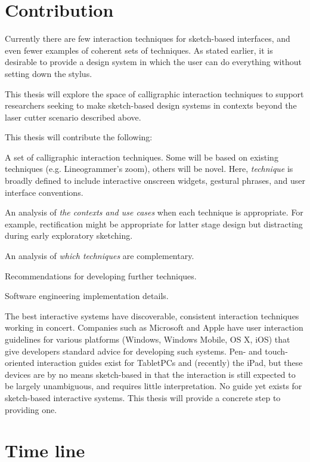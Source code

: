 \documentclass[11pt]{article}
\newenvironment{packed_enum}{
\begin{enumerate}
  \setlength{\itemsep}{1pt}
  \setlength{\parskip}{0pt}
  \setlength{\parsep}{0pt}
}{\end{enumerate}}
\begin{document}
\section{Contribution}

Currently there are few interaction techniques for sketch-based
interfaces, and even fewer examples of coherent sets of techniques. As
stated earlier, it is desirable to provide a design system in which
the user can do everything without setting down the stylus.

This thesis will explore the space of calligraphic interaction
techniques to support researchers seeking to make sketch-based design
systems in contexts beyond the laser cutter scenario described above.

This thesis will contribute the following:
\begin{packed_enum}
\item A set of calligraphic interaction techniques. Some will be based
  on existing techniques (e.g. Lineogrammer's zoom), others will be
  novel. Here, \textit{technique} is broadly defined to include
  interactive onscreen widgets, gestural phrases, and user interface
  conventions.
\item An analysis of \textit{the contexts and use cases} when each
  technique is appropriate. For example, rectification might be
  appropriate for latter stage design but distracting during early
  exploratory sketching.
\item An analysis of \textit{which techniques} are complementary.
\item Recommendations for developing further techniques.
\item Software engineering implementation details.
\end{packed_enum}

The best interactive systems have discoverable, consistent interaction
techniques working in concert. Companies such as Microsoft and Apple
have user interaction guidelines for various platforms (Windows,
Windows Mobile, OS X, iOS) that give developers standard advice for
developing such systems. Pen- and touch-oriented interaction guides
exist for TabletPCs and (recently) the iPad, but these devices are by
no means sketch-based in that the interaction is still expected to be
largely unambiguous, and requires little interpretation. No guide yet
exists for sketch-based interactive systems. This thesis will provide
a concrete step to providing one.

\section{Time line}
\end{document}
